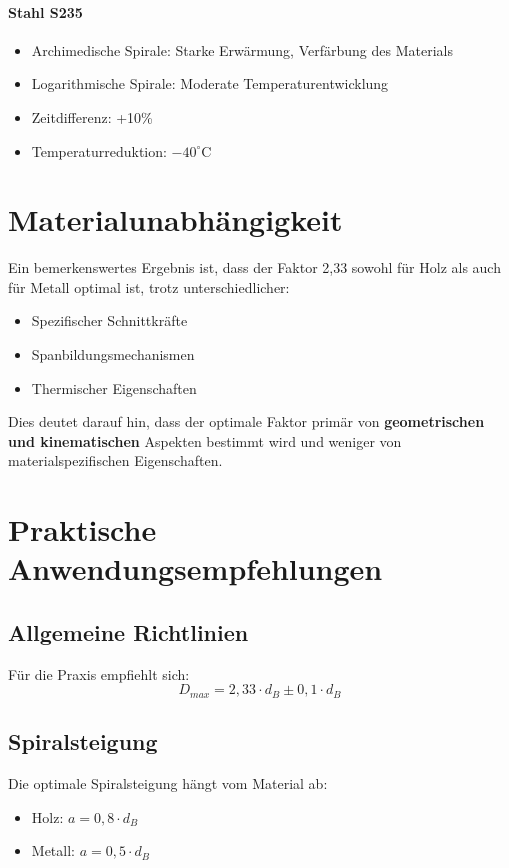 ﻿\documentclass[12pt,a4paper]{article}
\begin{document}
\paragraph{Stahl S235}
\begin{itemize}
	\item Archimedische Spirale: Starke Erwärmung, Verfärbung des Materials
	\item Logarithmische Spirale: Moderate Temperaturentwicklung
	\item Zeitdifferenz: +10\%
	\item Temperaturreduktion: $-40^\circ\text{C}$
\end{itemize}

\section{Materialunabhängigkeit}

Ein bemerkenswertes Ergebnis ist, dass der Faktor 2,33 sowohl für Holz als auch für Metall optimal ist, trotz unterschiedlicher:
\begin{itemize}
	\item Spezifischer Schnittkräfte
	\item Spanbildungsmechanismen
	\item Thermischer Eigenschaften
\end{itemize}

Dies deutet darauf hin, dass der optimale Faktor primär von \textbf{geometrischen und kinematischen} Aspekten bestimmt wird und weniger von materialspezifischen Eigenschaften.

\section{Praktische Anwendungsempfehlungen}

\subsection{Allgemeine Richtlinien}

Für die Praxis empfiehlt sich:
\begin{equation}
	D_{max} = 2{,}33 \cdot d_B \pm 0{,}1 \cdot d_B
\end{equation}

\subsection{Spiralsteigung}

Die optimale Spiralsteigung hängt vom Material ab:
\begin{itemize}
	\item Holz: $a = 0{,}8 \cdot d_B$
	\item Metall: $a = 0{,}5 \cdot d_B$
\end{itemize}
\end{document}
